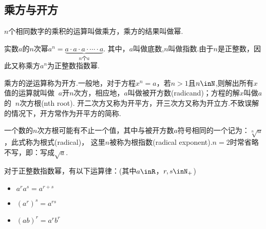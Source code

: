  \subsection{乘方与开方}
    \begin{description}[leftmargin=0pt]
      \item [乘方] $n$个相同数字的乘积的运算叫做{\fangsong 乘方}，乘方的结果叫做{\fangsong 幂}. \par
        实数$a$的$n$次幂$a^n=\underbrace{{a\cdot a\cdot a\cdot \cdots \cdot a}}_{n\text{个}a}$.
        其中，$a$叫做{\fangsong 底数},$n$叫做{\fangsong 指数}.由于$n$是正整数，因此又称乘方$a^n$为{\fangsong 正整数指数幂}.
      \item [开方] 乘方的逆运算称为{\fangsong 开方}.一般地，对于方程$x^n=a$，若$n>1$且$n\inN$,则解出所有$x$值的运算就叫做
        {\fangsong $~a$开$n$次方}，相应地，$a$叫做{\fangsong 被开方数}(radicand)；方程的解$x$叫做$a$的 {\fangsong $~n$次方根}(nth root).
        开二次方又称为{\fangsong 开平方}，开三次方又称为{\fangsong 开立方}.不致误解的情况下，开方常作为开平方的简称.

        一个数的$n$次方根可能有不止一个值，其中与被开方数$a$符号相同的一个记为：$\sqrt[n]a$，此式称为{\fangsong 根式}(radical)，
        这里$n$被称为{\fangsong 根指数(radical exponent)}.$n=2$时常省略不写，即：写成$\sqrt a$.
      \item [运算性质]对于正整数指数幂，有以下运算律：(其中$a\inR$，$r,s\inN_+$)
        \begin{itemize}%
          \item $a^ra^s=a^{r+s}$
          \item $(a^r)^s=a^{rs}$
          \item $(ab)^r=a^rb^r$
        \end{itemize}
    \end{description}

